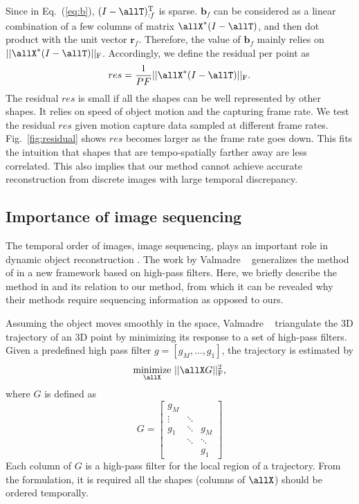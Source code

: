 Since in Eq.~(\ref{eq:b}), $(I-\allT)_{:f}^\text{T}$ is sparse. $\mathbf{b}_f$ can be considered as a linear combination of a few columns of matrix $\allX^*(I-\allT)$, and then dot product with the unit vector $\mathbf{r}_f$.
Therefore, the value of $\mathbf{b}_f$ mainly relies on $||\allX^*(I-\allT)||_\text{F}$.
Accordingly, we define the residual per point as
\begin{equation}
res = \frac{1}{PF}||\allX^*(I-\allT)||_\text{F}. \label{eq:residual}
\end{equation}
The residual $res$ is small if all the shapes can be well represented by other shapes. It relies on speed of object motion and the capturing frame rate. 
We test the residual $res$ given motion capture data sampled at different frame rates. Fig.~\ref{fig:residual} shows $res$ becomes larger as the frame rate goes down. This fits the intuition that shapes that are tempo-spatially farther away are less correlated. This also implies that our method cannot achieve accurate reconstruction from discrete images with large temporal discrepancy. 


\subsection{Importance of image sequencing} \label{sec:importance_of_image_sequencing}
The temporal order of images, \ie image sequencing, plays an important role in dynamic object reconstruction \cite{Park_ECCV2010,zheng2014joint,Valmadre_CVPR2012}. The work by Valmadre \etal~\cite{Valmadre_CVPR2012} generalizes the method of \cite{Park_ECCV2010} in a new framework based on high-pass filters. Here, we briefly describe the method in \cite{Valmadre_CVPR2012} and its relation to our method, from which it can be revealed why their methods require sequencing information as opposed to ours. 

Assuming the object moves smoothly in the space, Valmadre \etal~\cite{Valmadre_CVPR2012} triangulate the 3D trajectory of an 3D point by minimizing its response to a set of high-pass filters.
Given a predefined high pass filter $g=[g_M,\dots,g_1]$, the trajectory is estimated by 
\begin{equation}
\underset{\allX}{\text{minimize}} ~ || \allX G||_\text{F}^2,
\label{eq:valmadre_equ}
\end{equation}
where $G$ is defined as
\begin{equation}
G = \left[ 
\begin{matrix}
g_M  	&  		 &   	  	\\
\vdots	& \ddots &    	  	\\
g_1		& \ddots & g_M	  	\\
		& \ddots & \ddots 	\\
		&		 & g_1	
\end{matrix}
\right]
\label{eq:valmadre_filter_G}
\end{equation}
Each column of $G$ is a high-pass filter for the local region of a trajectory. From the formulation, it is required all the shapes (columns of $\allX$) should be ordered temporally. 

